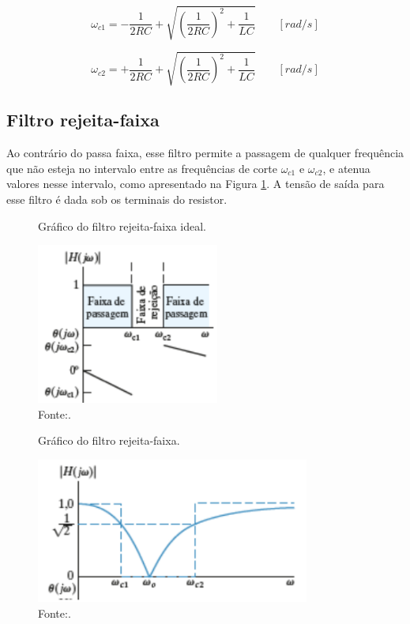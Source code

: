 \begin{equation}
	\omega_{c1} = - \frac{1}{2RC} + \sqrt{ (\frac{1}{2RC})^2 + \frac{1}{LC} } \qquad [rad/s]
	\label{omegaC1}
\end{equation}

\begin{equation}
	\omega_{c2} = + \frac{1}{2RC} + \sqrt{ (\frac{1}{2RC})^2 + \frac{1}{LC} } \qquad [rad/s]
	\label{omegaC2}
\end{equation}

\pagebreak

\subsection{Filtro rejeita-faixa}

Ao contrário do passa faixa, esse filtro permite a passagem de qualquer frequência que não esteja no intervalo entre as frequências de corte $\omega_{c1}$ e $\omega_{c2}$, e atenua valores nesse intervalo, como apresentado na Figura \ref{graficoRejeitaFaixaIdeal}. A tensão de saída para esse filtro é dada sob os terminais do resistor.

\begin{figure}[ht]
	\centering
	\caption{Gráfico do filtro rejeita-faixa ideal.}
	\includegraphics[width=6cm]{images/graficoRejeitaFaixaIdeal.png}
	\caption*{Fonte:\cite{nilsson2008circuitos}.}
	\label{graficoRejeitaFaixaIdeal}
\end{figure}

\begin{figure}[ht]
	\centering
	\caption{Gráfico do filtro rejeita-faixa.}
	\includegraphics[width=9cm]{images/graficoFiltroRejeitaFaixa.png}
	\caption*{Fonte:\cite{nilsson2008circuitos}.}
\end{figure}

